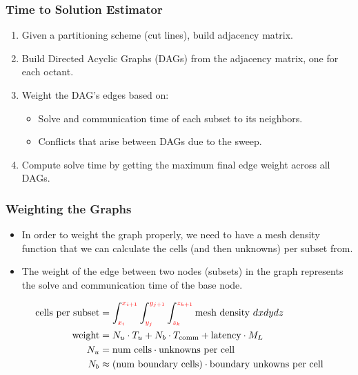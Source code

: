 \documentclass[xcolor={usenames,dvipsnames,svgnames,table}]{beamer}
\newcommand{\tcr}[1]{\textcolor{red}{#1}}
\begin{document}
\begin{frame}[t]\frametitle{Time to Solution Estimator}
\begin{block}{}
\begin{enumerate}
	\item Given a partitioning scheme (cut lines), build adjacency matrix.
	\item Build Directed Acyclic Graphs (DAGs) from the adjacency matrix, one for each octant.
	\item Weight the DAG's edges based on:
	\begin{itemize}
		\item Solve and communication time of each subset to its neighbors.
		\item Conflicts that arise between DAGs due to the sweep.
	\end{itemize}
	\item Compute solve time by getting the maximum final edge weight across all DAGs.
\end{enumerate}
\end{block}
\end{frame}

\begin{frame}[t]\frametitle{Weighting the Graphs}
\begin{block}{}
\begin{itemize}
	\item In order to weight the graph properly, we need to have a mesh density function that we can calculate the cells (and then unknowns) per subset from.
	\item The weight of the edge between two nodes (subsets) in the graph represents the solve and communication time of the base node.
\end{itemize}
\end{block}
\begin{block}{}
\begin{align}
\text{cells per subset} &= \int_{\tcr{x_i}}^{\tcr{x_{i+1}}} \int_{\tcr{y_j}}^{\tcr{y_{j+1}}} \int_{\tcr{z_k}}^{\tcr{z_{k+1}}} \text{mesh density } dx dy dz \\
\label{weight}
\text{weight} &= N_u\cdot T_u + N_b\cdot T_{\text{comm}} + \text{latency}\cdot M_L \\
N_u &= \text{num cells}\cdot \text{unknowns per cell} \\
N_b &\approx(\text{num boundary cells})\cdot \text{boundary unkowns per cell}
\end{align}
\end{block}
\end{frame}
\end{document}
